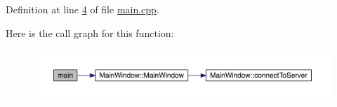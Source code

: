 Definition at line \hyperlink{a00238_source_l00004}{4} of file \hyperlink{a00238_source}{main.\+cpp}.

Here is the call graph for this function\+:
\nopagebreak
\begin{figure}[H]
\begin{center}
\leavevmode
\includegraphics[width=350pt]{da/d2e/a00238_a0ddf1224851353fc92bfbff6f499fa97_cgraph}
\end{center}
\end{figure}
